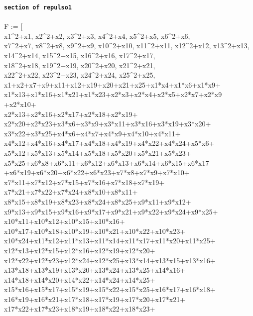 \documentclass[letterpaper,12pt,titlepage,oneside,final]{book}
\newenvironment{codefont}{\footnotesize\ttfamily}{\par}
\begin{document}
\begin{appendices}
\noindent\textbf{\texttt{section of repulso1}}\\\\
\noindent\begin{codefont}
 F := [\\
x1\^{}2+x1, x2\^{}2+x2, x3\^{}2+x3, x4\^{}2+x4, x5\^{}2+x5, x6\^{}2+x6, \\x7\^{}2+x7, x8\^{}2+x8, x9\^{}2+x9, x10\^{}2+x10, x11\^{}2+x11, x12\^{}2+x12, x13\^{}2+x13, \\x14\^{}2+x14, x15\^{}2+x15, x16\^{}2+x16, x17\^{}2+x17, \\x18\^{}2+x18, x19\^{}2+x19, x20\^{}2+x20, x21\^{}2+x21, \\x22\^{}2+x22, x23\^{}2+x23, x24\^{}2+x24, x25\^{}2+x25,\\
x1+x2+x7+x9+x11+x12+x19+x20+x21+x25+x1*x4+x1*x6+x1*x9+\\x1*x13+x1*x16+x1*x21+x1*x23+x2*x3+x2*x4+x2*x5+x2*x7+x2*x9\\+x2*x10+\\x2*x13+x2*x16+x2*x17+x2*x18+x2*x19+\\x2*x20+x2*x23+x3*x6+x3*x9+x3*x11+x3*x16+x3*x19+x3*x20+\\x3*x22+x3*x25+x4*x6+x4*x7+x4*x9+x4*x10+x4*x11+\\x4*x12+x4*x16+x4*x17+x4*x18+x4*x19+x4*x22+x4*x24+x5*x6+\\x5*x12+x5*x13+x5*x14+x5*x18+x5*x20+x5*x21+x5*x23+\\x5*x25+x6*x8+x6*x11+x6*x12+x6*x13+x6*x14+x6*x15+x6*x17\\+x6*x19+x6*x20+x6*x22+x6*x23+x7*x8+x7*x9+x7*x10+\\x7*x11+x7*x12+x7*x15+x7*x16+x7*x18+x7*x19+\\x7*x21+x7*x22+x7*x24+x8*x10+x8*x11+\\x8*x15+x8*x19+x8*x23+x8*x24+x8*x25+x9*x11+x9*x12+\\x9*x13+x9*x15+x9*x16+x9*x17+x9*x21+x9*x22+x9*x24+x9*x25+\\x10*x11+x10*x12+x10*x15+x10*x16+\\x10*x17+x10*x18+x10*x19+x10*x21+x10*x22+x10*x23+\\x10*x24+x11*x12+x11*x13+x11*x14+x11*x17+x11*x20+x11*x25+\\x12*x13+x12*x15+x12*x16+x12*x19+x12*x20+\\x12*x22+x12*x23+x12*x24+x12*x25+x13*x14+x13*x15+x13*x16+\\x13*x18+x13*x19+x13*x20+x13*x24+x13*x25+x14*x16+\\x14*x18+x14*x20+x14*x22+x14*x24+x14*x25+\\x15*x16+x15*x17+x15*x19+x15*x22+x15*x25+x16*x17+x16*x18+\\x16*x19+x16*x21+x17*x18+x17*x19+x17*x20+x17*x21+\\x17*x22+x17*x23+x18*x19+x18*x22+x18*x23+\\

\end{codefont}
\end{appendices}
\end{document}
